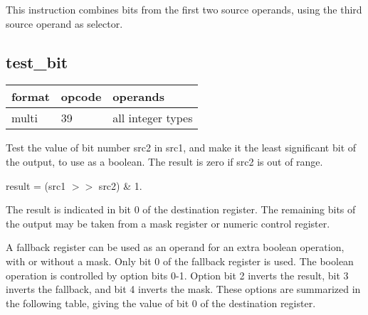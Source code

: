 \documentclass[forwardcom.tex]{subfiles}
\begin{document}
This instruction combines bits from the first two source operands, using the third source operand as selector.
\vv


\subsection{test\_bit}
\label{table:testBitInstruction}
\begin{tabular}{|p{12mm}|p{15mm}|p{100mm}|}
\hline
\bfseries format & \bfseries opcode & \bfseries operands \\ \hline
multi & 39 & all integer types \\ \hline
\end{tabular}
\vv

Test the value of bit number src2 in src1, and make it the least significant bit of the output, to use as a boolean. The result is zero if src2 is out of range.
\vv

result = (src1 $>>$ src2) \& 1.
\vv

The result is indicated in bit 0 of the destination register. 
The remaining bits of the output may be taken from a mask register or numeric control register.
\vv

A fallback register can be used as an operand for an extra boolean operation, with or without a mask. Only bit 0 of the fallback register is used. 
The boolean operation is controlled by option bits 0-1. 
Option bit 2 inverts the result, bit 3 inverts the fallback, and bit 4 inverts the mask. These options are summarized in the following table, giving the value of bit 0 of the destination register.
\end{document}

